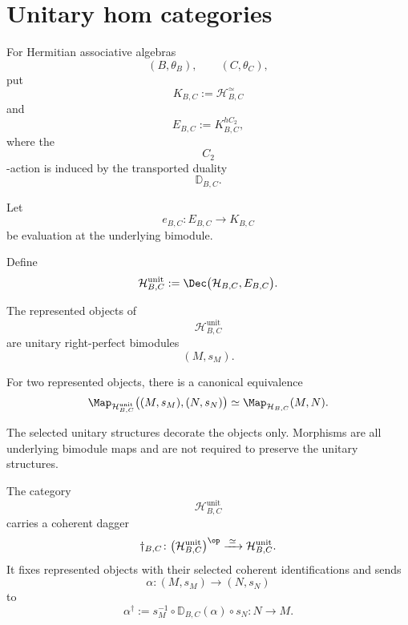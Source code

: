 \section{Unitary hom categories}
\label{sec:unitary-hom-categories}

\begin{construction}
\label{con:unitary-hom-category}
For Hermitian associative algebras
\[
    (B,\theta_B),
    \qquad
    (C,\theta_C),
\]
put
\[
    K_{B,C}
    :=
    \mathcal H_{B,C}^\simeq
\]
and
\[
    E_{B,C}
    :=
    K_{B,C}^{hC_2},
\]
where the
\[
    C_2
\]
-action is induced by the transported duality
\[
    \mathbb D_{B,C}.
\]

Let
\[
    e_{B,C}
    \colon
    E_{B,C}
    \longrightarrow
    K_{B,C}
\]
be evaluation at the underlying bimodule.

Define
\[
    \mathcal H^{\mathrm{unit}}_{B,C}
    :=
    \Dec
    \bigl(
        \mathcal H_{B,C},
        E_{B,C}
    \bigr).
\]
\end{construction}

\begin{proposition}
\label{prop:unitary-hom-category-properties}
The represented objects of
\[
    \mathcal H^{\mathrm{unit}}_{B,C}
\]
are unitary right-perfect bimodules
\[
    (M,s_M).
\]

For two represented objects, there is a canonical equivalence
\[
\begin{aligned}
    \Map_{\mathcal H^{\mathrm{unit}}_{B,C}}
    \bigl(
        (M,s_M),
        (N,s_N)
    \bigr)
    \simeq
    \Map_{\mathcal H_{B,C}}(M,N).
\end{aligned}
\]

The selected unitary structures decorate the objects only. Morphisms are
all underlying bimodule maps and are not required to preserve the
unitary structures.

The category
\[
    \mathcal H^{\mathrm{unit}}_{B,C}
\]
carries a coherent dagger
\[
    \dagger_{B,C}
    \colon
    \bigl(
        \mathcal H^{\mathrm{unit}}_{B,C}
    \bigr)^{\op}
    \xrightarrow{\;\simeq\;}
    \mathcal H^{\mathrm{unit}}_{B,C}.
\]
It fixes represented objects with their selected coherent
identifications and sends
\[
    \alpha
    \colon
    (M,s_M)
    \longrightarrow
    (N,s_N)
\]
to
\[
    \alpha^\dagger
    :=
    s_M^{-1}
    \circ
    \mathbb D_{B,C}(\alpha)
    \circ
    s_N
    \colon
    N
    \longrightarrow
    M.
\]
\end{proposition}

